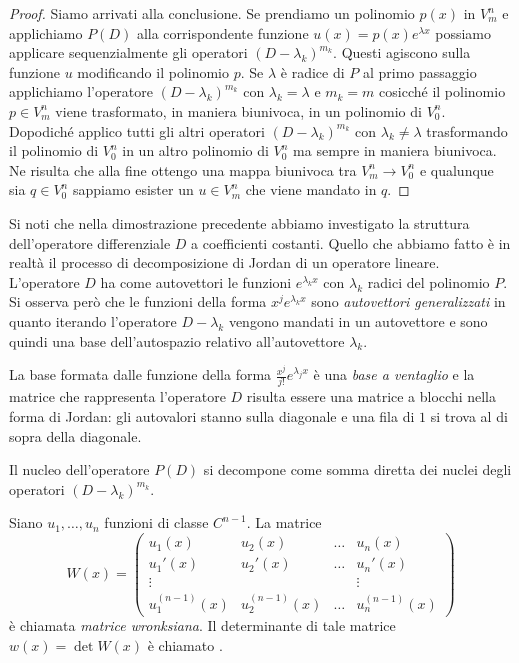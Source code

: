 \begin{proof}
Siamo arrivati alla conclusione. Se prendiamo un polinomio $p(x)$ in $V^n_m$ e applichiamo $P(D)$ alla corrispondente funzione $u(x) =p(x) e^{\lambda x}$
possiamo applicare sequenzialmente gli operatori $(D-\lambda_k)^{m_k}$. Questi agiscono sulla funzione $u$ modificando il polinomio $p$.
Se $\lambda$ è radice di $P$ al primo passaggio applichiamo l'operatore $(D-\lambda_k)^{m_k}$ con $\lambda_k=\lambda$ e $m_k=m$ cosicché il polinomio $p\in V^n_m$ viene trasformato, in maniera biunivoca, in un polinomio di $V^n_0$. Dopodiché applico tutti gli altri operatori $(D-\lambda_k)^{m_k}$ con $\lambda_k \neq \lambda$ trasformando il polinomio di $V^n_0$ in un altro polinomio di $V^n_0$ ma sempre in maniera biunivoca. Ne risulta che alla fine ottengo una mappa biunivoca tra $V^n_m \to V^n_0$ e qualunque sia $q\in V^n_0$ sappiamo esister un $u\in V^n_m$ che viene mandato in $q$.
\end{proof}

\begin{remark}
Si noti che nella dimostrazione precedente abbiamo investigato la
struttura dell'operatore differenziale $D$ a coefficienti
costanti.
Quello che abbiamo fatto è in realtà il processo di
decomposizione di Jordan di un operatore lineare.
L'operatore $D$
ha come autovettori le funzioni $e^{\lambda_k x}$ con $\lambda_k$
radici del polinomio $P$.
Si osserva però che le funzioni della forma
$x^j e^{\lambda_k x}$ sono \emph{autovettori generalizzati}
in quanto iterando l'operatore $D-\lambda_k$ vengono mandati in un autovettore
e sono quindi una base dell'autospazio relativo all'autovettore
$\lambda_k$.

La base formata dalle funzione della forma $\frac{x^j}{j!} e^{\lambda_j x}$ è
una \emph{base a ventaglio} e la matrice che rappresenta l'operatore
$D$ risulta essere una matrice a blocchi nella forma di Jordan: gli
autovalori stanno sulla diagonale e una fila di $1$ si trova al di sopra della
diagonale.

Il nucleo dell'operatore $P(D)$ si decompone come somma
diretta dei nuclei degli operatori $(D-\lambda_k)^{m_k}$.
\end{remark}

\begin{definition}[wronksiano]
Siano $u_1, \dots, u_n$ funzioni di classe $C^{n-1}$.
La matrice
\begin{equation}\label{eq:wronksiano}
  W(x) =
    \begin{pmatrix}
    u_1(x) & u_2(x) & \dots & u_n(x) \\
    u_1'(x) & u_2'(x) & \dots & u_n'(x) \\
    \vdots & & & \vdots\\
    u_1^{(n-1)}(x) & u_2^{(n-1)}(x) & \dots & u_n^{(n-1)}(x)
    \end{pmatrix}
\end{equation}
è chiamata \emph{matrice wronksiana}.
%
%
%
Il determinante di tale matrice
$w(x) = \det W(x)$ è chiamato
.
\end{definition}

